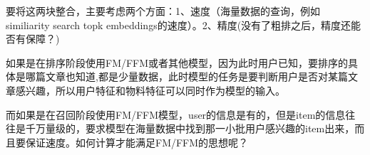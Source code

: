 \documentclass{article}
\begin{document}
\begin{CJK*}{UTF8}{gbsn}
\begin{enumerate}
要将这两块整合，主要考虑两个方面：1、速度（海量数据的查询，例如 similiarity search topk embeddings的速度）。2、精度(没有了粗排之后，精度还能否有保障？)

如果是在排序阶段使用FM/FFM或者其他模型，因为此时用户已知，要排序的具体是哪篇文章也知道,都是少量数据，此时模型的任务是要判断用户是否对某篇文章感兴趣，所以用户特征和物料特征可以同时作为模型的输入。

而如果是在召回阶段使用FM/FFM模型，user的信息是有的，但是item的信息往往是千万量级的，要求模型在海量数据中找到那一小批用户感兴趣的item出来，而且要保证速度。如何计算才能满足FM/FFM的思想呢？


\end{enumerate}




\end{CJK*}
\end{document}
